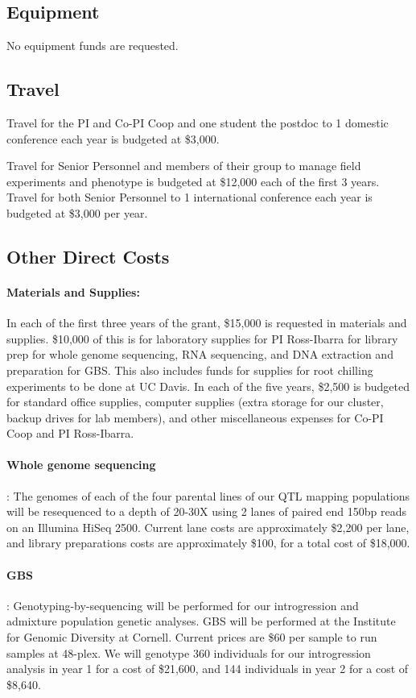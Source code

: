 \subsection*{Equipment}

No equipment funds are requested.

\subsection*{Travel}

Travel for the PI and Co-PI Coop and one student the postdoc to 1 domestic conference each year is budgeted at \$3,000.  

Travel for Senior Personnel and members of their group to manage field experiments and phenotype is budgeted at \$12,000 each of the first 3 years. Travel for both Senior Personnel to 1 international conference each year is budgeted at \$3,000 per year.

\subsection*{Other Direct Costs}

 \paragraph{Materials and Supplies:}
In each of the first three years of the grant, \$15,000 is requested in materials and supplies.  \$10,000 of this is for laboratory supplies for PI Ross-Ibarra for library prep for whole genome sequencing, RNA sequencing, and DNA extraction and preparation for GBS.  This also includes funds for supplies for root chilling experiments to be done at UC Davis.  In each of the five years, \$2,500 is budgeted for standard office supplies, computer supplies (extra storage for our cluster, backup drives for lab members), and other miscellaneous expenses for Co-PI Coop and PI Ross-Ibarra. 
\paragraph{Whole genome sequencing}:
The genomes of each of the four parental lines of our QTL mapping populations will be resequenced to a depth of 20-30X using 2 lanes of paired end 150bp reads on an Illumina HiSeq 2500. Current lane costs are approximately \$2,200 per lane, and library preparations costs are approximately \$100, for a total cost of \$18,000.

\paragraph{GBS}:
Genotyping-by-sequencing will be performed for our introgression and admixture population genetic analyses. GBS will be performed at the Institute for Genomic Diversity at Cornell.  Current prices are \$60 per sample to run samples at 48-plex.  We will genotype 360 individuals for our introgression analysis in year 1 for a cost of \$21,600, and 144 individuals in year 2 for a cost of \$8,640. 

